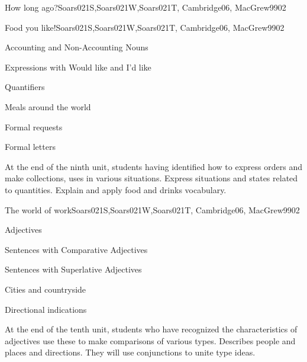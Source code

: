 \begin{syllabus}
\begin{unit}{}{How long ago?}{Soars021S,Soars021W,Soars021T, Cambridge06, MacGrew99}{0}{2}
\end{unit}

\begin{unit}{}{Food you like!}{Soars021S,Soars021W,Soars021T, Cambridge06, MacGrew99}{0}{2}
   \begin{topics}
      \item Accounting and Non-Accounting Nouns
      \item Expressions with Would like and I'd like
      \item Quantifiers
      \item Meals around the world
      \item Formal requests
      \item Formal letters
   \end{topics}

   \begin{learningoutcomes}
      \item At the end of the ninth unit, students having identified how to express orders and make collections, uses in various situations. Express situations and states related to quantities. Explain and apply food and drinks vocabulary.
   \end{learningoutcomes}
\end{unit}

\begin{unit}{}{The world of work}{Soars021S,Soars021W,Soars021T, Cambridge06, MacGrew99}{0}{2}
   \begin{topics}
      \item Adjectives
      \item Sentences with Comparative Adjectives
      \item Sentences with Superlative Adjectives
      \item Cities and countryside
      \item Directional indications
   \end{topics}

   \begin{learningoutcomes}
      \item At the end of the tenth unit, students who have recognized the characteristics of adjectives use these to make comparisons of various types. Describes people and places and directions. They will use conjunctions to unite type ideas.
   \end{learningoutcomes}

\end{unit}


\end{syllabus}
